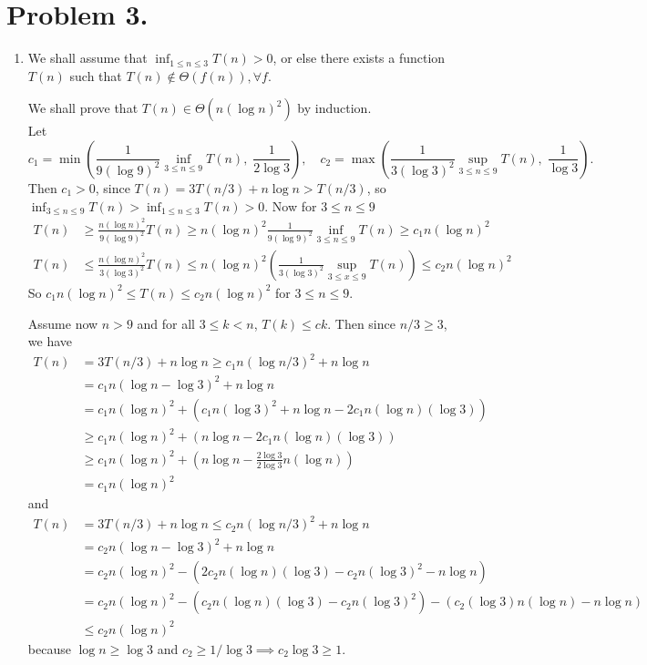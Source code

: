 \documentclass[12pt, a4paper]{article}
\begin{document}
\section{Problem 3.}
\begin{enumerate}
  \item We shall assume that $\inf_{1 \leq n \leq 3} T(n) > 0$, or else there exists a function $T(n)$ 
    such that $T(n) \notin \Theta(f(n)), \forall f$.

    We shall prove that $T(n) \in \Theta\left(n (\log n)^2 \right)$ by induction. \\
    Let \[ c_1 = \min\left(\frac{1}{9 (\log 9)^2} \inf_{3 \leq n \leq 9} T(n),\; \frac{1}{2 \log 3} \right), \quad
    c_2 = \max\left(\frac{1}{3(\log 3)^2}\sup_{3 \leq n \leq 9} T(n),\; \frac{1}{\log 3}\right). \] 
    Then $c_1 > 0$, since $T(n) = 3T(n/3) + n \log n > T(n/3)$, so \\
    $\inf_{3 \leq n \leq 9} T(n) > \inf_{1 \leq n \leq 3} T(n) > 0$.
    Now for $3 \leq n \leq 9$
    \begin{align*}
      T(n) &\geq \frac{n (\log n)^2}{9 (\log 9)^2} T(n) 
      \geq n (\log n)^2 \frac{1}{9 (\log 9)^2} \inf_{3 \leq n \leq 9}T(n)
      \geq c_1 n (\log n)^2 \\
      T(n) &\leq \frac{n (\log n)^2}{3(\log 3)^2} T(n) \leq n (\log n)^2 \left(\frac{1}{3 (\log 3)^2} 
        \sup_{3 \leq x \leq 9} T(n) \right) 
      \leq c_2 n (\log n)^2
    \end{align*}
    So $c_1 n (\log n)^2 \leq T(n) \leq c_2 n (\log n)^2$ for $3 \leq n \leq 9$.

    Assume now $n > 9$ and for all $3 \leq k < n$, $T(k) \leq ck$. Then since $n/3 \geq 3$, we have
    \begin{align*}
      T(n) &= 3 T(n/3) + n \log n \geq c_1 n (\log n/3)^2 + n \log n \\
      &= c_1 n (\log n - \log 3)^2 + n \log n \\
      &= c_1 n (\log n)^2 + \left(  c_1 n (\log 3)^2 + n \log n  - 2c_1 n (\log n) (\log 3)\right) \\
      &\geq c_1 n (\log n)^2 + \left(  n \log n  - 2c_1 n (\log n) (\log 3)\right) \\
      &\geq c_1 n (\log n)^2 + \left(  n \log n  - \frac{2 \log 3}{2 \log 3} n (\log n) \right) \\
      &= c_1 n (\log n)^2
    \end{align*} and
    \begin{align*}
      T(n) &= 3 T(n/3) + n \log n \leq c_2 n (\log n/3)^2 + n \log n \\
      &= c_2 n (\log n - \log 3)^2 + n \log n \\
      &= c_2 n (\log n)^2 - \left( 2c_2 n (\log n) (\log 3) - c_2 n (\log 3)^2 - n \log n \right) \\
      &= c_2 n (\log n)^2 - \left(c_2 n (\log n) (\log 3) - c_2 n (\log 3)^2 \right) - 
      \left(c_2 (\log 3) n (\log n) - n \log n \right) \\
      & \leq c_2 n (\log n)^2
    \end{align*}
    because $\log n \geq \log 3$ and $c_2 \geq 1 / \log 3 \implies c_2 \log 3 \geq  1$.


\end{enumerate}
\end{document}
